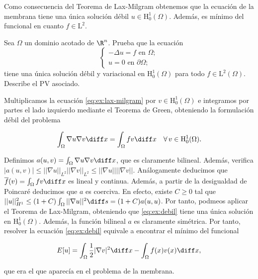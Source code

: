 \documentclass{article}
\begin{document}
Como consecuencia del Teorema de Lax-Milgram obtenemos que la ecuación de la membrana tiene una
única solución débil $u \in \mathrm{H}_0^1(\Omega)$. Además, es mínimo del funcional en cuanto
$f \in \mathrm{L}^2$.

\begin{ex}
  Sea $\Omega$ un dominio acotado de $\R^n$. Prueba que la ecuación
  \begin{equation}
    \label{eq:ex:lax-milgram}
    \begin{cases}
      -\Delta u = f \text{ en } \Omega; \\
      u = 0 \text{ en } \partial \Omega;
    \end{cases}
  \end{equation}
  tiene una única solución débil y variacional en $\mathrm{H}_0^1(\Omega)$ para todo
  $f \in \mathrm{L}^2(\Omega)$. Describe el PV asociado.

  Multiplicamos la ecuación \eqref{eq:ex:lax-milgram} por $v \in \mathrm{H}_0^1(\Omega)$ e
  integramos por partes el lado izquierdo mediante el Teorema de Green, obteniendo la formulación
  débil del problema

  \begin{equation}
    \label{eq:ex:debil}
    \int_{\Omega} \nabla u \nabla v \diff x = \int_{\Omega} f v \diff x \quad \forall \, v \in \mathrm{H}_0^1(\Omega).
  \end{equation}

  Definimos $a(u,v) = \int_{\Omega} \nabla u \nabla v \diff x$, que es claramente bilineal. Además,
  verifica $|a(u,v)| \le ||\nabla u||_{L^2} ||\nabla v||_{L^2} \le ||\nabla u|| ||\nabla
  v||$. Análogamente deducimos que $\overline{f}(v) = \int_{\Omega} f v \diff x$ es lineal y
  continua. Además, a partir de la desigualdad de Poincaré deducimos que $a$ es coerciva. En efecto,
  existe $C \ge 0$ tal que
  $||u||^2_{H^1} \le (1+C) \int_{\Omega} ||\nabla u||^2 \diff s = (1+C) a(u,u)$. Por tanto, podmeos
  aplicar el Teorema de Lax-Milgram, obteniendo que \eqref{eq:ex:debil} tiene una única solución en
  $\mathrm{H}_0^1(\Omega)$. Además, la función bilineal $a$ es claramente simétrica. Por tanto,
  resolver la ecuación \eqref{eq:ex:debil} equivale a encontrar el mínimo del funcional
  
  \begin{equation*}
    E[u] = \int_{\Omega} \frac{1}{2}|\nabla v|^2 \diff x -\int_{\Omega}
    f(x) v(x) \diff x,
  \end{equation*}

  que era el que aparecía en el problema de la membrana.
  
\end{ex}
\end{document}
